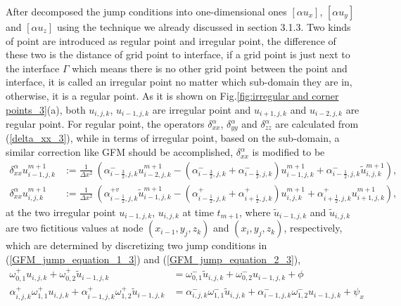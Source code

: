 \documentclass[dissertation]{uathesis}
\begin{document}
\begin{body}
\begin{flushleft}
\hspace{1cm} After decomposed the jump conditions into one-dimensional ones $[\alpha u_x]$, $[\alpha u_y]$ and $[\alpha u_z]$ using the technique we already discussed in section 3.1.3. Two kinds of point are introduced as regular point and irregular point, the difference of these two is the distance of grid point to interface, if a grid point is just next to the interface $\Gamma$ which means there is no other grid point between the point and interface, it is called an irregular point no matter which sub-domain they are in, otherwise, it is a regular point. As it is shown on Fig.\ref{fig:irregular and corner points_3}(a), both $u_{i,j,k}$, $u_{i-1,j,k}$ are irregular point and $u_{i+1,j,k}$ and $u_{i-2,j,k}$ are regular point. For regular point, the operators $\delta_{xx}^{\alpha}$, $\delta_{yy}^{\alpha}$ and $\delta_{zz}^{\alpha}$ are calculated from (\ref{delta_xx_3}), while in terms of irregular point, based on the sub-domain, a similar correction like GFM should be accomplished, 
$\delta_{xx}^{\alpha}$ is modified to be 
%
\begin{align}
\label{reformed_delta_xx_1}
\delta_{xx}^{\alpha} u^{m+1}_{i-1,j,k} &:=  
\frac{1}{\Delta x^{2}} ~ (\alpha^{-}_{i-\frac{3}{2},j,k} u^{m+1}_{i-2,j,k} - (\alpha^{-}_{i-\frac{3}{2},j,k} + \alpha^{-}_{i-\frac{1}{2},j,k}) u^{m+1}_{i-1,j,k} + \alpha^{-}_{i-\frac{1}{2},j,k} \tilde{u}^{m+1}_{i,j,k}), \\
\label{reformed_delta_xx_2}
\delta_{xx}^{\alpha} u^{m+1}_{i,j,k} &:=  
\frac{1}{\Delta x^{2}} ~ (\alpha^{+v}_{i-\frac{1}{2},j,k} \tilde{u}^{m+1}_{i-1,j,k} - (\alpha^{+}_{i-\frac{1}{2},j,k} + \alpha^{+}_{i+\frac{1}{2},j,k}) u^{m+1}_{i,j,k} + \alpha^{+}_{i+\frac{1}{2},j,k} u^{m+1}_{i+1,j,k}),
\end{align}
%
at the two irregular point $u_{i-1,j,k}$, $u_{i,j,k}$ at time $t_{m+1}$, where $\tilde u_{i-1,j,k}$ and $\tilde u_{i,j,k}$ are two fictitious values at node $(x_{i-1},y_j,z_k)$ and $(x_i,y_j,z_k)$, respectively, which are determined by discretizing two jump conditions in (\ref{GFM_jump_equation_1_3}) and (\ref{GFM_jump_equation_2_3}),
%
\begin{align}
\label{MIB_V1_jump_1_3}
\omega^{+}_{0,1}u_{i,j,k} + \omega^{+}_{0,2} \tilde{u}_{i-1,j,k} &=
\omega^{-}_{0,1} \tilde{u}_{i,j,k} + \omega^{-}_{0,2}u_{i-1,j,k} + \phi \\
\label{MIB_V2_jump_2_3} 
\alpha^{+}_{i,j,k}\omega^{+}_{1,1}u_{i,j,k}+\alpha^{+}_{i-1,j,k}\omega^{+}_{1,2}\tilde{u}_{i-1,j,k} &= 
\alpha^{-}_{i,j,k}\omega^{-}_{1,1}\tilde{u}_{i,j,k} + \alpha^{-}_{i-1,j,k}\omega^{-}_{1,2}u_{i-1,j,k} + \psi_{x}

\end{align}
\end{flushleft}
\end{body}
\end{document}
